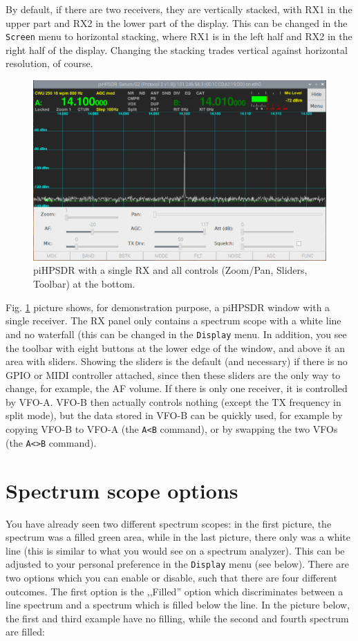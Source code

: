 \documentclass[12pt]{book}
\def\bltt#1{\texttt{\color{blue}#1}}
\begin{document}
 By default, if there are two receivers, they are vertically stacked,
 with RX1 in the upper part and RX2 in the lower part of the display.
 This can be changed in the \bltt{Screen} menu to horizontal stacking,
 where RX1 is  in the left half and RX2 in the right half of  the 
 display. Changing the stacking trades vertical against horizontal
 resolution, of course.
 
  
\begin{figure}[h]
\center
\includegraphics[width=12cm]{SingleReceiver.png}
\caption{piHPSDR with a single RX and all controls (Zoom/Pan,
Sliders, Toolbar) at the  bottom.}
\label{fig:SingleReceiver}
\end{figure}

 Fig. \ref{fig:SingleReceiver} picture shows, for demonstration purpose, a piHPSDR
 window with a single receiver. 
 The RX panel only contains a
 spectrum scope with a white line and no waterfall (this can be changed in the
 \bltt{Display} menu. In addition, you see the toolbar
 with eight buttons at the lower edge of the window, and above
 it an area with sliders. Showing the sliders is the default
 (and necessary) if there is no GPIO or MIDI controller attached,
 since then these sliders are the only way to change, for example,
 the AF volume. If there is only one receiver, it is controlled
 by VFO-A. VFO-B then actually controls nothing (except the TX
 frequency in split mode), but the data stored in VFO-B can
 be quickly used, for example by copying VFO-B to VFO-A (the
 \bltt{A<B} command), or by swapping the two VFOs (the
 \bltt{A<>B} command).

\section{Spectrum scope options}

You have already seen two different spectrum scopes: in the first
picture, the  spectrum was a filled green area, while in the last
picture, there only was a white line (this is similar to what you
would see on a spectrum analyzer). This can be adjusted to your
personal preference in the \bltt{Display} menu (see below). There
are two options which you can enable or disable, such that there
are four different outcomes. The first option is the ,,Filled'' option
which discriminates between a line spectrum and a spectrum which is
filled below the line. In the picture below, the first and third
example have no filling, while the second and fourth spectrum
are filled:
\end{document}
